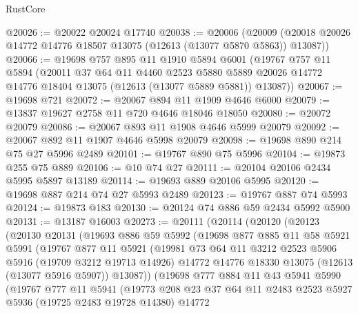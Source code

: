 \begin{lexlean}{RustCore}
\begin{coremodule}
@20026 := @20022 @20024 @17740
@20038 := @20006
    (@20009 (@20018 @20026 @14772 @14776 @18507 @13075 (@12613 (@13077 @5870 @5863)) @13087))
@20066 := @19698
    @757
    @895
    @11
    @1910
    @5894
    @6001
    (@19767
      @757
      @11
      @5894
      (@20011
        @37
        @64
        @11
        @4460
        @2523
        @5880
        @5889
        @20026
        @14772
        @14776
        @18404
        @13075
        (@12613 (@13077 @5889 @5881))
        @13087))
@20067 := @19698 @721
@20072 := @20067 @894 @11 @1909 @4646 @6000
@20079 := @13837 @19627 @2758 @11 @720 @4646 @18046 @18050
@20080 := @20072 @20079
@20086 := @20067 @893 @11 @1908 @4646 @5999 @20079
@20092 := @20067 @892 @11 @1907 @4646 @5998 @20079
@20098 := @19698 @890 @214 @75 @27 @5996 @2489
@20101 := @19767 @890 @75 @5996
@20104 := @19873 @255 @75 @889
@20106 := @10 @74 @27
@20111 := @20104 @20106 @2434 @5995 @5897 @13189
@20114 := @19693 @889 @20106 @5995
@20120 := @19698 @887 @214 @74 @27 @5993 @2489
@20123 := @19767 @887 @74 @5993
@20124 := @19873 @183
@20130 := @20124 @74 @886 @59 @2434 @5992 @5900
@20131 := @13187 @16003
@20273 := @20111
    (@20114
      (@20120
        (@20123
          (@20130
            @20131
            (@19693
              @886
              @59
              @5992
              (@19698
                @877
                @885
                @11
                @58
                @5921
                @5991
                (@19767
                  @877
                  @11
                  @5921
                  (@19981
                    @73
                    @64
                    @11
                    @3212
                    @2523
                    @5906
                    @5916
                    (@19709 @3212 @19713 @14926)
                    @14772
                    @14776
                    @18330
                    @13075
                    (@12613 (@13077 @5916 @5907))
                    @13087))
                (@19698
                  @777
                  @884
                  @11
                  @43
                  @5941
                  @5990
                  (@19767
                    @777
                    @11
                    @5941
                    (@19773
                      @208
                      @23
                      @37
                      @64
                      @11
                      @2483
                      @2523
                      @5927
                      @5936
                      (@19725 @2483 @19728 @14380)
                      @14772

\end{coremodule}
\end{lexlean}
